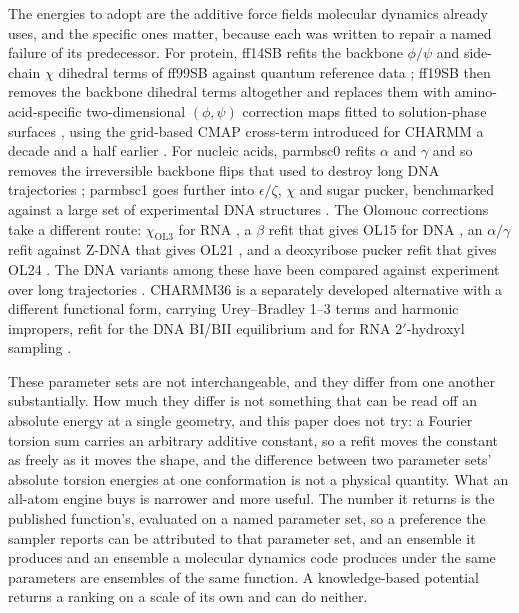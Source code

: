 The energies to adopt are the additive force fields molecular dynamics already
uses, and the specific ones matter, because each was written to repair a named
failure of its predecessor. For protein, ff14SB refits the backbone $\phi/\psi$
and side-chain $\chi$ dihedral terms of ff99SB against quantum reference data
\cite{maier2015ff14sb}; ff19SB then removes the backbone dihedral terms
altogether and replaces them with amino-acid-specific two-dimensional
$(\phi,\psi)$ correction maps fitted to solution-phase surfaces
\cite{tian2020ff19sb}, using the grid-based CMAP cross-term introduced for
CHARMM a decade and a half earlier
\cite{mackerell2004cmap,mackerell2004cmapfull}. For nucleic acids, parmbsc0
refits $\alpha$ and $\gamma$ and so removes the irreversible backbone flips that
used to destroy long DNA trajectories \cite{perez2007bsc0}; parmbsc1 goes
further into $\epsilon/\zeta$, $\chi$ and sugar pucker, benchmarked against a
large set of experimental DNA structures \cite{ivani2016bsc1}. The Olomouc
corrections take a different route: $\chi_{\mathrm{OL3}}$ for RNA
\cite{zgarbova2011ol3}, a $\beta$ refit that gives OL15 for DNA
\cite{zgarbova2015ol15}, an $\alpha/\gamma$ refit against Z-DNA that gives OL21
\cite{zgarbova2021ol21}, and a deoxyribose pucker refit that gives OL24
\cite{zgarbova2025ol24}. The DNA variants among these have been compared
against experiment over long trajectories
\cite{galindomurillo2016amberdna,love2023amberdna}. CHARMM36 is a separately
developed alternative with a different functional form, carrying Urey--Bradley
1--3 terms and harmonic impropers, refit for the DNA BI/BII equilibrium
\cite{hart2012charmm36dna} and for RNA $2'$-hydroxyl sampling
\cite{denning2011charmm36rna}.

These parameter sets are not interchangeable, and they differ from one another
substantially. How much they differ is not something that can be read off an
absolute energy at a single geometry, and this paper does not try: a Fourier
torsion sum carries an arbitrary additive constant, so a refit moves the
constant as freely as it moves the shape, and the difference between two
parameter sets' absolute torsion energies at one conformation is not a physical
quantity. What an all-atom engine buys is narrower and more useful. The number
it returns is the published function's, evaluated on a named parameter set, so a
preference the sampler reports can be attributed to that parameter set, and an
ensemble it produces and an ensemble a molecular dynamics code produces under
the same parameters are ensembles of the same function. A knowledge-based
potential returns a ranking on a scale of its own and can do neither.

